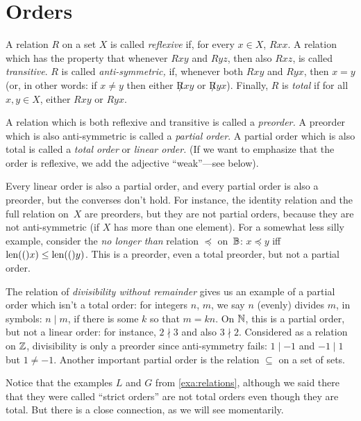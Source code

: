 \documentclass[open-logic-section]{subfiles}
\begin{document}
\section{Orders}

\begin{defn}
A relation $R$ on a set $X$ is called \emph{reflexive} if, for every
$x\in X$, $Rxx$. A relation which has the property that whenever $Rxy$
and $Ryz$, then also $Rxz$, is called \emph{transitive}.  $R$ is
called \emph{anti-symmetric,} if, whenever both $Rxy$ and $Ryx$, then
$x=y$ (or, in other words: if $x\neq y$ then either $\not Rxy$ or
$\not Ryx$). Finally, $R$ is \emph{total} if for all $x,y\in X$,
either $Rxy$ or $Ryx$.

A relation which is both reflexive and transitive is called a
\emph{preorder.}  A preorder which is also anti-symmetric is called a
\emph{partial order}. A partial order which is also total is called a
\emph{total order} or \emph{linear order.} (If we want to emphasize
that the order is reflexive, we add the adjective ``weak''---see
below).
\end{defn}

\begin{ex}
Every linear order is also a partial order, and every partial order is
also a preorder, but the converses don't hold. For instance, the
identity relation and the full relation on~$X$ are preorders, but they
are not partial orders, because they are not anti-symmetric (if $X$
has more than one element). For a somewhat less silly example,
consider the \emph{no longer than} relation $\preccurlyeq$
on~$\mathbb{B}$: $x\preccurlyeq y$ iff $\mathrm{len}(()x)\le\mathrm{len}(()y)$. This is a
preorder, even a total preorder, but not a partial order.

The relation of \emph{divisibility without remainder} gives us an
example of a partial order which isn't a total order: for integers
$n$, $m$, we say $n$ (evenly) divides $m$, in symbols: $n\mid m$, if
there is some $k$ so that $m=kn$.  On $\mathbb{N}$, this is a partial order,
but not a linear order: for instance, $2\nmid3$ and also
$3\nmid2$. Considered as a relation on $\mathbb{Z}$, divisibility is only a
preorder since anti-symmetry fails: $1\mid-1$ and $-1\mid1$ but
$1\neq-1$. Another important partial order is the relation $\subseteq$
on a set of sets.

Notice that the examples $L$ and $G$ from \ref{exa:relations},
although we said there that they were called ``strict orders'' are not
total orders even though they are total. But there is a close
connection, as we will see momentarily.
\end{ex}
\end{document}
